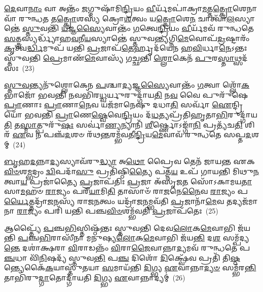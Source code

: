 {%
{\anuvakamend[{𑌨𑌾𑌦𑌿᳴𑌷𑍍𑌟\-\ul{𑌙𑍍𑌕𑍁}\-𑌰𑍍𑌵𑌨𑍍𑌤𑌿᳴ 𑌦𑍍𑌵𑌾\-\ul{𑌦}\-𑌶\-\ul{𑌭𑌿}\-𑌰𑌿𑌤𑌿᳴ 𑌵𑌿𑍞\-\ul{𑌶}\-𑌤𑌿𑌶𑍍𑌚᳴}]}%

\-\ul{𑌦𑍇}\-𑌵𑌾\-\ul{𑌨𑌾𑌂} 𑌵𑌾 𑌅𑌨𑍍𑌤𑌂᳴ \ul{𑌜}\-𑌗𑍍𑌮𑍁𑌷𑌾᳴𑌮𑌿\-\ul{𑌨𑍍𑌦𑍍𑌰𑌿}\-𑌯𑌂 \ul{𑌵𑍀}\-𑌰𑍍𑌯᳴𑌮𑌪𑌾॑𑌕𑍍𑌰𑌾\-\ul{𑌮}\-𑌤𑍍𑌤\-\ul{𑌤𑍍𑌕𑍍𑌰𑍋}\-𑌶𑍇𑌨𑌾𑌵𑌾᳴ 𑌰𑍁𑌨𑍍𑌧\-\ul{𑌤} 𑌤\-\ul{𑌤𑍍𑌕𑍍𑌰𑍋}\-𑌶𑌸𑍍𑌯᳴ 𑌕𑍍𑌰𑍋\-\ul{𑌶}\-𑌤𑍍𑌵𑌂 𑌯\-\ul{𑌤𑍍𑌕𑍍𑌰𑍋}\-𑌶𑍇\-\ul{𑌨} 𑌚𑌾𑌤𑍍𑌵𑌾᳴\-\ul{𑌲}\-𑌸𑍍𑌯𑌾𑌨𑍍𑌤𑍇॑ \ul{𑌸𑍍𑌤𑍁}\-𑌵𑌨𑍍𑌤𑌿᳴ \ul{𑌯}\-𑌜𑍍𑌞\-\ul{𑌸𑍍𑌯𑍈}\-𑌵𑌾𑌨𑍍𑌤𑌂᳴ \ul{𑌗}\-𑌤𑍍𑌵𑍇\-\ul{𑌨𑍍𑌦𑍍𑌰𑌿}\-𑌯𑌂 \ul{𑌵𑍀}\-𑌰𑍍𑌯᳴𑌮𑌵᳴ 𑌰𑍁𑌨𑍍𑌧𑌤𑍇 \ul{𑌸}\-𑌤𑍍𑌤𑍍𑌰𑌸𑍍𑌯𑌰𑍍𑌦𑍍𑌧𑍍𑌯𑌾᳴𑌹\-\ul{𑌵}\-𑌨𑍀\-\ul{𑌯}\-𑌸𑍍𑌯𑌾𑌨𑍍𑌤𑍇॑ 𑌸𑍍𑌤𑍁𑌵\-\ul{𑌨𑍍𑌤𑍍𑌯}\-𑌗𑍍𑌨𑌿\-\ul{𑌮𑍇}\-𑌵𑍋𑌪᳴\-\ul{𑌦𑍍𑌰}\-𑌷𑍍𑌟𑌾𑌰𑌂᳴ \ul{𑌕𑍃}\-𑌤𑍍𑌵\-\ul{𑌰𑍍𑌦𑍍𑌧𑌿}\-𑌮𑍁𑌪᳴ 𑌯𑌨𑍍𑌤𑌿 \ul{𑌪𑍍𑌰}\-𑌜𑌾𑌪᳴\-\ul{𑌤𑍇}\-𑌰𑍍\mbox{}𑌹𑍃𑌦᳴𑌯𑍇𑌨 𑌹\-\ul{𑌵𑌿}\-𑌰𑍍𑌧𑌾\-\ul{𑌨𑍇}\-\-𑌽𑌨𑍍𑌤𑌃 𑌸𑍍𑌤𑍁᳴𑌵𑌨𑍍𑌤𑌿 \ul{𑌪𑍍𑌰𑍇}\-𑌮𑌾𑌣᳴\-\ul{𑌮𑍇}\-𑌵𑌾𑌸𑍍𑌯᳴ 𑌗𑌚𑍍𑌛𑌨𑍍𑌤𑌿 \ul{𑌶𑍍𑌲𑍋}\-𑌕𑍇𑌨᳴ \ul{𑌪𑍁}\-𑌰\-\ul{𑌸𑍍𑌤𑌾}\-𑌥𑍍𑌸𑌦᳴𑌸𑌃~(23)

\-\ul{𑌸𑍍𑌤𑍁}\-\-\ul{𑌵}\-𑌨𑍍𑌤𑍍𑌯𑌨𑍁᳴𑌶𑍍𑌲𑍋𑌕𑍇𑌨 \ul{𑌪}\-𑌶𑍍𑌚𑌾\-\ul{𑌦𑍍𑌯}\-𑌜𑍍𑌞\-\ul{𑌸𑍍𑌯𑍈}\-𑌵𑌾𑌨𑍍𑌤𑌂᳴ \ul{𑌗}\-𑌤𑍍𑌵𑌾 𑌶𑍍𑌲𑍋᳴\-\ul{𑌕}\-𑌭𑌾𑌜𑍋᳴ 𑌭𑌵𑌨𑍍𑌤𑌿 \ul{𑌨}\-𑌵𑌭𑌿᳴𑌰\-\ul{𑌧𑍍𑌵}\-𑌰𑍍𑌯𑍁𑌰𑍁𑌦𑍍𑌗𑌾᳴𑌯\-\ul{𑌤𑌿} 𑌨\-\ul{𑌵} 𑌵𑍈 𑌪𑍁𑌰𑍁᳴𑌷𑍇 \ul{𑌪𑍍𑌰𑌾}\-𑌣𑌾𑌃 \ul{𑌪𑍍𑌰𑌾}\-𑌣𑌾\-\ul{𑌨𑍇}\-𑌵 𑌯𑌜᳴𑌮𑌾𑌨𑍇𑌷𑍁 𑌦𑌧𑌾\-\ul{𑌤𑌿} 𑌸𑌰𑍍𑌵𑌾᳴ \ul{𑌐}\-𑌨𑍍𑌦𑍍𑌰𑌿𑌯𑍋᳴ 𑌭𑌵𑌨𑍍𑌤𑌿 \ul{𑌪𑍍𑌰𑌾}\-𑌣𑍇\-\ul{𑌷𑍍𑌵𑍇}\-𑌵𑍇\-\ul{𑌨𑍍𑌦𑍍𑌰𑌿}\-𑌯𑌂 𑌦᳴\-\ul{𑌧}\-𑌤𑍍𑌯𑌪𑍍𑌰᳴𑌤𑌿𑌹𑍃𑌤𑌾\-\ul{𑌭𑌿}\-𑌰𑍁𑌦𑍍𑌗𑌾᳴𑌯\-\ul{𑌤𑌿} 𑌤\-\ul{𑌸𑍍𑌮𑌾}\-𑌤𑍍𑌪𑍁𑌰𑍁᳴\-\ul{𑌷𑌃} 𑌸𑌰𑍍𑌵𑌾॑\-\ul{𑌣𑍍𑌯}\-𑌨𑍍𑌯𑌾𑌨𑌿᳴ \ul{𑌶𑍀}\-𑌰𑍍𑌷𑍍𑌣𑍋\-𑌽𑌙𑍍𑌗𑌾᳴\-\ul{𑌨𑌿} 𑌪𑍍𑌰𑌤𑍍𑌯᳴𑌚\-\ul{𑌤𑌿} 𑌶𑌿𑌰᳴ \ul{𑌏}\-𑌵 𑌨 𑌪𑌞𑍍𑌚᳴\-\ul{𑌦}\-𑌶𑍞 𑌰᳴𑌥\-\ul{𑌨𑍍𑌤}\-𑌰𑌮𑍍𑌭᳴𑌵𑌤𑍀\-\ul{𑌨𑍍𑌦𑍍𑌰𑌿}\-𑌯\-\ul{𑌮𑍇}\-𑌵𑌾𑌵᳴ 𑌰𑍁𑌨𑍍𑌧𑌤𑍇 𑌸𑌪𑍍𑌤\-\ul{𑌦}\-𑌶𑌮𑍍~(24)

\-\ul{𑌬𑍃}\-𑌹\-\ul{𑌦}\-𑌨𑍍𑌨𑌾\-\ul{𑌦𑍍𑌯}\-𑌸𑍍𑌯𑌾𑌵᳴𑌰𑍁\-\ul{𑌦𑍍𑌧𑍍𑌯𑌾} 𑌅\-\ul{𑌥𑍋} 𑌪𑍍𑌰𑍈𑌵 𑌤𑍇𑌨᳴ 𑌜𑌾𑌯𑌨𑍍𑌤 𑌏𑌕\-\ul{𑌵𑌿}\-\-\ul{𑍞}\-𑌶\-\ul{𑌮𑍍𑌭}\-𑌦𑍍𑌰𑌂 \ul{𑌦𑍍𑌵𑌿}\-𑌪𑌦𑌾᳴\-\ul{𑌸𑍁} 𑌪𑍍𑌰𑌤𑌿᳴𑌷𑍍𑌠𑌿\-\ul{𑌤𑍍𑌯𑍈} 𑌪𑌤𑍍𑌨᳴\-\ul{𑌯} 𑌉𑌪᳴ 𑌗𑌾𑌯𑌨𑍍𑌤𑌿 𑌮𑌿𑌥𑍁\-\ul{𑌨}\-𑌤𑍍𑌵𑌾\-\ul{𑌯} 𑌪𑍍𑌰𑌜𑌾॑𑌤𑍍𑌯𑍈 \ul{𑌪𑍍𑌰}\-𑌜𑌾𑌪᳴𑌤𑌿𑌃 \ul{𑌪𑍍𑌰}\-𑌜𑌾 𑌅᳴𑌸𑍃𑌜\-\ul{𑌤} 𑌸𑍋᳴\-𑌽𑌕𑌾𑌮𑌯\-\ul{𑌤𑌾}\-𑌸𑌾\-\ul{𑌮}\-𑌹𑍞 \ul{𑌰𑌾}\-𑌜𑍍𑌯𑌂 𑌪𑌰𑍀᳴\-\ul{𑌯𑌾}\-𑌮𑌿\-\ul{𑌤𑌿} 𑌤𑌾𑌸𑌾𑍞᳴ 𑌰𑌾\-\ul{𑌜}\-𑌨𑍇\-\ul{𑌨𑍈}\-𑌵 \ul{𑌰𑌾}\-𑌜𑍍𑌯𑌂 𑌪\-\ul{𑌰𑍍𑌯𑍈}\-𑌤𑍍𑌤𑌦𑍍𑌰𑌾᳴\-\ul{𑌜}\-𑌨𑌸𑍍𑌯᳴ 𑌰𑌾𑌜\-\ul{𑌨}\-𑌤𑍍𑌵𑌂 𑌯𑌦𑍍𑌰𑌾᳴\-\ul{𑌜}\-𑌨𑌮𑍍𑌭𑌵᳴𑌤𑌿 \ul{𑌪𑍍𑌰}\-𑌜𑌾𑌨𑌾᳴\-\ul{𑌮𑍇}\-𑌵 𑌤𑌦𑍍𑌯𑌜᳴𑌮𑌾𑌨𑌾 \ul{𑌰𑌾}\-𑌜𑍍𑌯𑌂 𑌪𑌰𑌿᳴ 𑌯𑌨𑍍𑌤𑌿 𑌪𑌞𑍍𑌚\-\ul{𑌵𑌿}\-\-\ul{𑍞}\-𑌶𑌮𑍍𑌭᳴𑌵𑌤𑌿 \ul{𑌪𑍍𑌰}\-𑌜𑌾𑌪᳴𑌤𑍇𑌃~(25)

𑌆𑌪𑍍𑌤𑍍𑌯𑍈᳴ \ul{𑌪}\-𑌞𑍍𑌚\-\ul{𑌭𑌿}\-𑌸𑍍𑌤𑌿𑌷𑍍𑌠᳴𑌨𑍍𑌤𑌃 𑌸𑍍𑌤𑍁𑌵𑌨𑍍𑌤𑌿 𑌦𑍇𑌵\-\ul{𑌲𑍋}\-𑌕\-\ul{𑌮𑍇}\-𑌵𑌾𑌭𑌿 𑌜᳴𑌯𑌨𑍍𑌤𑌿 \ul{𑌪}\-𑌞𑍍𑌚\-\ul{𑌭𑌿}\-𑌰𑌾𑌸𑍀᳴𑌨𑌾 𑌮𑌨𑍁𑌷𑍍𑌯\-\ul{𑌲𑍋}\-𑌕\-\ul{𑌮𑍇}\-𑌵𑌾𑌭𑌿 𑌜᳴𑌯\-\ul{𑌨𑍍𑌤𑌿} 𑌦\-\ul{𑌶} 𑌸𑌮𑍍𑌪᳴𑌦𑍍𑌯\-\ul{𑌨𑍍𑌤𑍇} 𑌦𑌶𑌾॑𑌕𑍍𑌷𑌰𑌾 \ul{𑌵𑌿}\-𑌰𑌾𑌡𑌨𑍍𑌨𑌂᳴ \ul{𑌵𑌿}\-𑌰𑌾\-\ul{𑌜𑍈}\-𑌵𑌾𑌨𑍍𑌨𑌾\-\ul{𑌦𑍍𑌯}\-𑌮𑌵᳴ 𑌰𑍁𑌨𑍍𑌧𑌤𑍇 𑌪\-\ul{𑌞𑍍𑌚}\-𑌧𑌾 𑌵𑌿᳴\-\ul{𑌨𑌿}\-𑌷𑌦𑍍𑌯᳴ 𑌸𑍍𑌤𑍁𑌵\-\ul{𑌨𑍍𑌤𑌿} 𑌪\-\ul{𑌞𑍍𑌚} 𑌦𑌿𑌶𑍋᳴ \ul{𑌦𑌿}\-𑌕𑍍𑌷𑍍𑌵𑍇᳴𑌵 𑌪𑍍𑌰𑌤𑌿᳴ 𑌤𑌿\-\ul{𑌷𑍍𑌠}\-𑌨𑍍𑌤𑍍𑌯𑍇𑌕𑍈᳴\-\ul{𑌕}\-𑌯𑌾𑌸𑍍𑌤𑍁᳴𑌤𑌯𑌾 \ul{𑌸}\-𑌮𑌾𑌯᳴𑌨𑍍𑌤𑌿 \ul{𑌦𑌿}\-𑌗𑍍𑌭𑍍𑌯 \ul{𑌏}\-𑌵𑌾𑌨𑍍𑌨𑌾\-\ul{𑌦𑍍𑌯}\-\-\ul{𑍞} 𑌸𑌮𑍍𑌭᳴𑌰\-\ul{𑌨𑍍𑌤𑌿} 𑌤𑌾𑌭𑌿᳴𑌰𑍁\-\ul{𑌦𑍍𑌗𑌾}\-𑌤𑍋𑌦𑍍𑌗𑌾᳴𑌯𑌤𑌿 \ul{𑌦𑌿}\-𑌗𑍍𑌭𑍍𑌯 \ul{𑌏}\-𑌵𑌾𑌨𑍍𑌨𑌾𑌦𑍍𑌯𑌮𑍍॑~(26)

}

